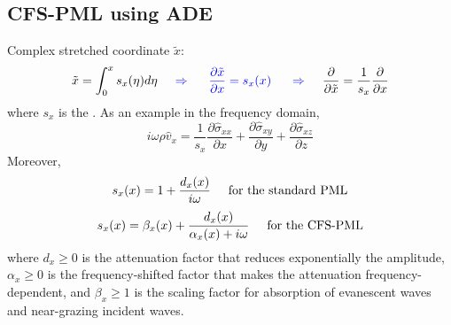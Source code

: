 \subsection{CFS-PML using ADE}
Complex stretched coordinate $\tilde x$:
\[ \tilde x=\int_0^xs_x(\eta)d\eta {\color{blue} \hspace{5mm}\Rightarrow\hspace{5mm} \frac{\partial\tilde x}{\partial x}=s_x(x) \hspace{5mm}\Rightarrow\hspace{5mm} } \frac{\partial}{\partial\tilde x}=\frac{1}{s_x}\frac{\partial}{\partial x} \]
where $s_x$ is the .
As an example in the frequency domain,
\[ i\omega\rho\hat v_x=\frac{1}{s_x}\frac{\partial\hat\sigma_{xx}}{\partial x}+\frac{\partial\hat\sigma_{xy}}{\partial y}+\frac{\partial\hat\sigma_{xz}}{\partial z} \]
Moreover,
\[ s_x(x)=1+\frac{d_x(x)}{i\omega} \hspace{5mm}\text{for the standard PML} \]
\[ s_x(x)=\beta_x(x)+\frac{d_x(x)}{\alpha_x(x)+i\omega} \hspace{5mm}\text{for the CFS-PML} \]
where $d_x\geqslant 0$ is the attenuation factor that
reduces exponentially the amplitude,
$\alpha_x\geqslant 0$ is the frequency-shifted factor that
makes the attenuation frequency-dependent,
and $\beta_x\geqslant 1$ is the scaling factor for absorption
of evanescent waves and near-grazing incident waves.

